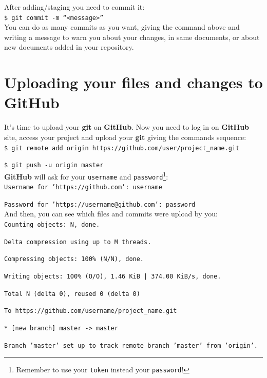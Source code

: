 \documentclass[12pt,a4paper,titlepage,brazil]{article}
\begin{document}
{After adding/staging you need to commit it:\\

\texttt{\$ git commit -m ``<message>''}\\

You can do as many commits as you want, giving the command above and writing a message to warn you about your changes, in same documents, or about new documents added in your repository.


\section{Uploading your files and changes to GitHub}

It's time to upload your {\bf git} on {\bf GitHub}. Now you need to log in on {\bf GitHub} site, access your project and upload your {\bf git} giving the commands sequence:\\

\texttt{\$ git remote add origin https://github.com/user/project\_name.git}

\texttt{\$ git push -u origin master}\\

{\bf GitHub} will ask for your \texttt{username} and  \texttt{password}\footnote{Remember to use your \texttt{token} instead your \texttt{password}!}:\\

\texttt{Username for 'https://github.com': username}

\texttt{Password for 'https://username@github.com': password}\\

And then, you can see which files and commits were upload by you:\\

\texttt{Counting objects: N, done.}
  
\texttt{Delta compression using up to M threads.}

\texttt{Compressing objects: 100\% (N/N), done.}

\texttt{Writing objects: 100\% (O/O), 1.46 KiB | 374.00 KiB/s, done.}

\texttt{Total N (delta 0), reused 0 (delta 0)}

\texttt{To https://github.com/username/project\_name.git}

\texttt{* [new branch]      master -> master}

\texttt{Branch 'master' set up to track remote branch 'master' from 'origin'.}\\

}
\end{document}
